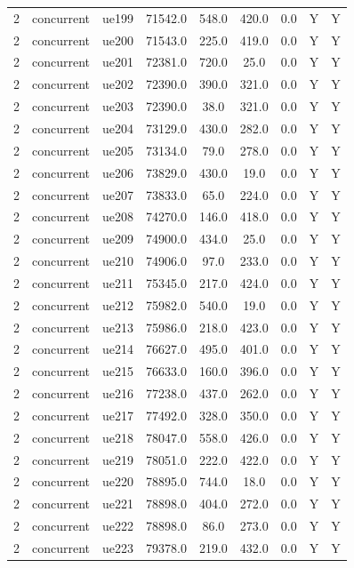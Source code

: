 \begin{table}[ht]
\begin{tabular}{|c|c|c|c|c|c|c|c|c|}
2 & concurrent & ue199 & 71542.0 & 548.0 & 420.0 & 0.0 & Y & Y \\
2 & concurrent & ue200 & 71543.0 & 225.0 & 419.0 & 0.0 & Y & Y \\
2 & concurrent & ue201 & 72381.0 & 720.0 & 25.0 & 0.0 & Y & Y \\
2 & concurrent & ue202 & 72390.0 & 390.0 & 321.0 & 0.0 & Y & Y \\
2 & concurrent & ue203 & 72390.0 & 38.0 & 321.0 & 0.0 & Y & Y \\
2 & concurrent & ue204 & 73129.0 & 430.0 & 282.0 & 0.0 & Y & Y \\
2 & concurrent & ue205 & 73134.0 & 79.0 & 278.0 & 0.0 & Y & Y \\
2 & concurrent & ue206 & 73829.0 & 430.0 & 19.0 & 0.0 & Y & Y \\
2 & concurrent & ue207 & 73833.0 & 65.0 & 224.0 & 0.0 & Y & Y \\
2 & concurrent & ue208 & 74270.0 & 146.0 & 418.0 & 0.0 & Y & Y \\
2 & concurrent & ue209 & 74900.0 & 434.0 & 25.0 & 0.0 & Y & Y \\
2 & concurrent & ue210 & 74906.0 & 97.0 & 233.0 & 0.0 & Y & Y \\
2 & concurrent & ue211 & 75345.0 & 217.0 & 424.0 & 0.0 & Y & Y \\
2 & concurrent & ue212 & 75982.0 & 540.0 & 19.0 & 0.0 & Y & Y \\
2 & concurrent & ue213 & 75986.0 & 218.0 & 423.0 & 0.0 & Y & Y \\
2 & concurrent & ue214 & 76627.0 & 495.0 & 401.0 & 0.0 & Y & Y \\
2 & concurrent & ue215 & 76633.0 & 160.0 & 396.0 & 0.0 & Y & Y \\
2 & concurrent & ue216 & 77238.0 & 437.0 & 262.0 & 0.0 & Y & Y \\
2 & concurrent & ue217 & 77492.0 & 328.0 & 350.0 & 0.0 & Y & Y \\
2 & concurrent & ue218 & 78047.0 & 558.0 & 426.0 & 0.0 & Y & Y \\
2 & concurrent & ue219 & 78051.0 & 222.0 & 422.0 & 0.0 & Y & Y \\
2 & concurrent & ue220 & 78895.0 & 744.0 & 18.0 & 0.0 & Y & Y \\
2 & concurrent & ue221 & 78898.0 & 404.0 & 272.0 & 0.0 & Y & Y \\
2 & concurrent & ue222 & 78898.0 & 86.0 & 273.0 & 0.0 & Y & Y \\
2 & concurrent & ue223 & 79378.0 & 219.0 & 432.0 & 0.0 & Y & Y \\

\end{tabular}
\end{table}
